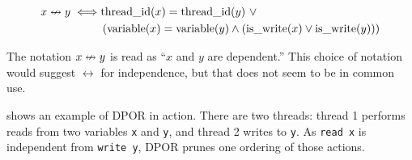 \begin{align*}
  x \nleftrightarrow y \iff& \mathrm{thread\_id}(x) = \mathrm{thread\_id}(y)~\lor\\
    &\left(\mathrm{variable}(x) = \mathrm{variable}(y)
     \land \left(\mathrm{is\_write}(x) \lor \mathrm{is\_write}(y)\right)\right)
\end{align*}

The notation $x \nleftrightarrow y$ is read as ``$x$ and $y$ are
dependent.''  This choice of notation would suggest $\leftrightarrow$
for independence, but that does not seem to be in common use.

 shows an example of DPOR in action.  There are two
threads: thread 1 performs reads from two variables \verb|x| and
\verb|y|, and thread 2 writes to \verb|y|.  As \verb|read x| is
independent from \verb|write y|, DPOR prunes one ordering of those
actions.

